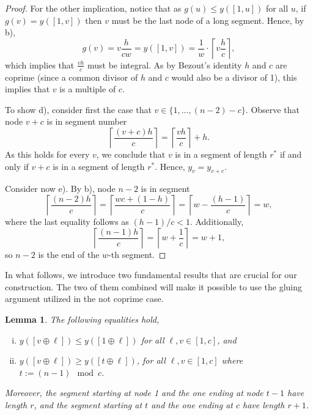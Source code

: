 \documentclass[11pt]{article}
\newtheorem{lemma}{Lemma}[section]
\newcommand\+{\mkern2mu}
\newcommand{\ceil}[1]{\left\lceil #1 \right\rceil}
\begin{document}
\begin{proof}
    For the other implication, notice that as $g(u)\le y([1,u])$ for all $u$, if $g(v)=y([1,v])$ then $v$ must be the last node of a long segment. Hence, by b),
    $$g(v)= v \frac{h}{cw} = y([1,v])=\frac{1}{w}\cdot \ceil{v\frac{h}{c}},$$
    which implies that $\frac{vh}{c}$ must be integral. As by Bezout's identity  $h$ and $c$ are coprime (since a common divisor of $h$ and $c$ would also be a divisor of 1), this implies that $v$ is a multiple of $c$. 

    To show d), consider first the case that $v \in \{1, \ldots, (n-2)-c\}$. Observe that node $v+c$ is in segment number
    $$
    \ceil{\frac{(v+c)h}{c}} = \ceil{\frac{vh}{c}} + h.
    $$
    As this holds for every $v$, we conclude that $v$ is in a segment of length $r^*$ if and only if $v+c$ is in a segment of length $r^*$. Hence, $y_v=y_{v+c}$.
    
    Consider now e). By b), node $n-2$ is in segment
    $$
    \ceil{\frac{(n-2)h}{c}} = \ceil{\frac{wc + (1-h)}{c}} = \ceil{w-\frac{(h-1)}{c}} = w,
    $$
    where the last equality follows as $(h-1)/c < 1$. Additionally,
    $$
    \ceil{\frac{(n-1)h}{c}} =  \ceil{w+\frac{1}{c}} = w + 1,
    $$
    so $n-2$ is the end of the $w$-th segment.
\end{proof}

In what follows, we introduce two fundamental results that are crucial for our construction. The two of them combined will make it possible to use the gluing argument utilized in the not coprime case.

\begin{lemma}
    The following equalities hold,
    \begin{enumerate}[i)]
        \item $y([v \oplus \ell]) \leq y([1\oplus \ell])$ for all $\ell,v\in [1,c]$, and
        \item $y([v \oplus \ell]) \ge y([t\oplus  \ell])$, for all $\ell,v\in [1,c]$ where $t := (n-1) \mod c$.
    \end{enumerate}
    Moreover, the segment starting at node 1 and the one ending at node $t-1$ have length $r$, and the segment starting at $t$ and the one ending at $c$ have length $r+1$.
    \label{lm:yExtrema}
\end{lemma}
\end{document}
